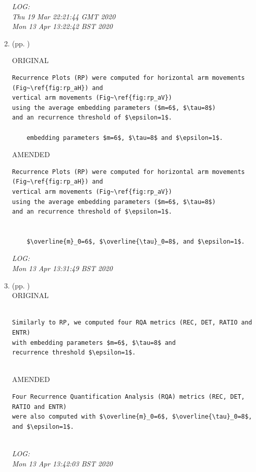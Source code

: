 \documentclass[10pt]{article}
\begin{document}
\begin{enumerate}
\begin{verbatim}
\end{verbatim}

	\textit{
LOG: \\
Thu 19 Mar 22:21:44 GMT 2020  \\
Mon 13 Apr 13:22:42 BST 2020
	}
	\\




\item  (pp. ) 

ORIGINAL
\begin{verbatim}
Recurrence Plots (RP) were computed for horizontal arm movements (Fig~\ref{fig:rp_aH}) and 
vertical arm movements (Fig~\ref{fig:rp_aV}) 
using the average embedding parameters ($m=6$, $\tau=8$) 
and an recurrence threshold of $\epsilon=1$.

	embedding parameters $m=6$, $\tau=8$ and $\epsilon=1$.
\end{verbatim}

AMENDED
\begin{verbatim}
Recurrence Plots (RP) were computed for horizontal arm movements (Fig~\ref{fig:rp_aH}) and 
vertical arm movements (Fig~\ref{fig:rp_aV}) 
using the average embedding parameters ($m=6$, $\tau=8$) 
and an recurrence threshold of $\epsilon=1$.


	$\overline{m}_0=6$, $\overline{\tau}_0=8$, and $\epsilon=1$.
\end{verbatim}

	\textit{
LOG: \\
 Mon 13 Apr 13:31:49 BST 2020
	}
	\\




\item  (pp. ) \\ 
ORIGINAL
\begin{verbatim}

Similarly to RP, we computed four RQA metrics (REC, DET, RATIO and ENTR) 
with embedding parameters $m=6$, $\tau=8$ and 
recurrence threshold $\epsilon=1$.
 

\end{verbatim}

AMENDED
\begin{verbatim}
Four Recurrence Quantification Analysis (RQA) metrics (REC, DET, RATIO and ENTR) 
were also computed with $\overline{m}_0=6$, $\overline{\tau}_0=8$, and $\epsilon=1$. 
 

\end{verbatim}

\textit{
LOG: \\ 
Mon 13 Apr 13:42:03 BST 2020
}
\\




\end{enumerate}
\end{document}

